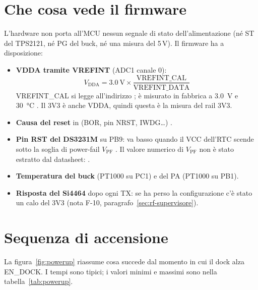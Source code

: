 \section{Che cosa vede il firmware}
L'hardware non porta all'MCU nessun segnale di stato dell'alimentazione (né ST del TPS2121, né PG del buck, né una misura del 5\,V). Il firmware ha a disposizione:
\begin{itemize}
\item \textbf{VDDA tramite VREFINT} (ADC1 canale 0):
\[ V_\text{DDA} = \SI{3.0}{\volt}\times\frac{\text{VREFINT\_CAL}}{\text{VREFINT\_DATA}} \]
VREFINT\_CAL si legge all'indirizzo ; è misurato in fabbrica a \SI{3.0}{\volt} e \SI{30}{\celsius} . Il 3V3 è anche VDDA, quindi questa è la misura del rail 3V3.
\item \textbf{Causa del reset} in  (BOR, pin NRST, IWDG\ldots) .
\item \textbf{Pin RST del DS3231M} su PB9: va basso quando il VCC dell'RTC scende sotto la soglia di power-fail $V_\text{PF}$ . Il valore numerico di $V_\text{PF}$ non è stato estratto dal datasheet: \DV.
\item \textbf{Temperatura del buck} (PT1000 su PC1) e del PA (PT1000 su PB1).
\item \textbf{Risposta del Si4464} dopo ogni TX: se ha perso la configurazione c'è stato un calo del 3V3 (nota F-10, paragrafo~\ref{sec:rf-supervisore}).
\end{itemize}

\section{Sequenza di accensione}
\label{sec:powerup}
La figura~\ref{fig:powerup} riassume cosa succede dal momento in cui il dock alza EN\_DOCK. I tempi sono tipici; i valori minimi e massimi sono nella tabella~\ref{tab:powerup}.

